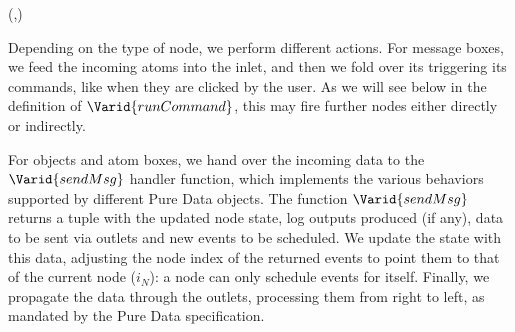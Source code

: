 \begin{hscode}\SaveRestoreHook
{}%
%
\>[B]{}\mathbin{::}\to {}\to (,)\to {}\to {}\<[E]%
\ColumnHook
\end{hscode}\resethooks

Depending on the type of node, we perform different actions. For message
boxes, we feed the incoming atoms into the inlet, and then we fold over its
triggering its commands, like when they are clicked by the user. As we will
see below in the definition of \ensuremath{\Varid{runCommand}}, this may fire further nodes
either directly or indirectly.

\resethooks

For objects and atom boxes, we hand over the incoming data to the
\ensuremath{\Varid{sendMsg}} handler function, which implements the various behaviors
supported by different Pure Data objects. The function \ensuremath{\Varid{sendMsg}}
returns a tuple with the updated node state, log outputs produced (if any),
data to be sent via outlets and new events to be scheduled. We update the
state with this data, adjusting the node index of the returned events to point
them to that of the current node (\ensuremath{i_{N}}): a node can only schedule events for
itself. Finally, we propagate the data through the outlets, processing them
from right to left, as mandated by the Pure Data specification.

